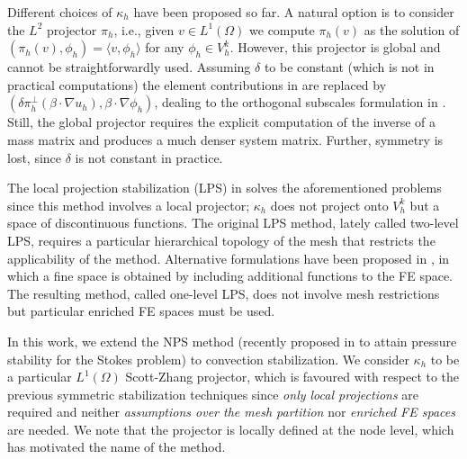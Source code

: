
Different choices of $\kappa_h$ have been proposed so far. A natural option is to consider the $L^2$ projector $\pi_h$, i.e., given $v \in L^1(\Omega)$ we compute $\pi_h(v)$ as the solution of $(\pi_h(v),\phi_h) = \langle v, \phi_h\rangle$ for any $\phi_h \in V^k_h$. However, this projector is global and cannot be straightforwardly used. Assuming $\delta$ to be constant (which is not in practical computations) the element contributions in  are replaced by $ (\delta \pi_h^{\perp}( \beta \cdot \nabla u_h),  \beta \cdot \nabla \phi_h)$, dealing to the orthogonal subscales formulation in \cite{codina_stabilization_2000}. Still, the global projector requires the explicit computation of the inverse of a mass matrix and produces a much denser system matrix. %
Further, symmetry is lost, since $\delta$ is not constant in practice.

The local projection stabilization (LPS) in \cite{braack_local_2006} solves the aforementioned problems since this method involves a local projector; $\kappa_h$ does not project onto $V^k_h$ but a space of discontinuous functions. The original LPS method, lately called two-level LPS, requires a particular hierarchical topology of the mesh that restricts the applicability of the method. Alternative formulations have been proposed in \cite{matthies_unified_2007}, in which a fine space is obtained by including additional functions to the FE space. The resulting method, called one-level LPS, does not involve mesh restrictions but particular enriched FE spaces must be used.

In this work, we extend the NPS method (recently proposed in \cite{badia_stabilized_2012} to attain pressure stability for the Stokes problem) to convection stabilization. We consider $\kappa_h$ to be a particular $L^1(\Omega)$ Scott-Zhang projector, which is favoured with respect to the previous symmetric stabilization techniques since \emph{only local projections} are required and neither \emph{assumptions over the mesh partition} nor \emph{enriched FE spaces} are needed. We note that the projector is locally defined at the node level, which has motivated the name of the method.


